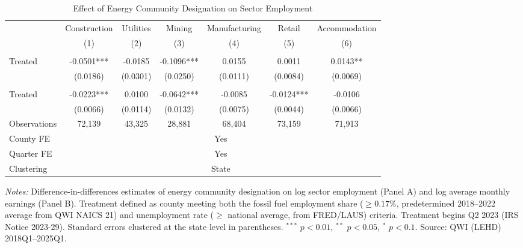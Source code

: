 \begin{table}[htbp]
\centering
\begin{threeparttable}
\caption{Effect of Energy Community Designation on Sector Employment}
\label{tab:main}
\footnotesize
\begin{tabular}{lcccccc}
\toprule
 & Construction & Utilities & Mining & Manufacturing & Retail & Accommodation \\
 & (1) & (2) & (3) & (4) & (5) & (6) \\
\midrule
\addlinespace
\multicolumn{7}{l}{\textit{Panel A: Log Employment}} \\
\addlinespace
Treated & -0.0501*** & -0.0185 & -0.1096*** & 0.0155 & 0.0011 & 0.0143** \\
 & (0.0186) & (0.0301) & (0.0250) & (0.0111) & (0.0084) & (0.0069) \\
\addlinespace
\multicolumn{7}{l}{\textit{Panel B: Log Earnings}} \\
\addlinespace
Treated & -0.0223*** & 0.0100 & -0.0642*** & -0.0085 & -0.0124*** & -0.0106 \\
 & (0.0066) & (0.0114) & (0.0132) & (0.0075) & (0.0044) & (0.0066) \\
\addlinespace
\midrule
Observations & 72,139 & 43,325 & 28,881 & 68,404 & 73,159 & 71,913 \\
County FE & \multicolumn{6}{c}{Yes} \\
Quarter FE & \multicolumn{6}{c}{Yes} \\
Clustering & \multicolumn{6}{c}{State} \\
\bottomrule
\end{tabular}
\begin{tablenotes}[flushleft]\scriptsize
\item \textit{Notes:} Difference-in-differences estimates of energy community designation on log sector employment (Panel A) and log average monthly earnings (Panel B). Treatment defined as county meeting both the fossil fuel employment share ($\geq 0.17\%$, predetermined 2018--2022 average from QWI NAICS 21) and unemployment rate ($\geq$ national average, from FRED/LAUS) criteria. Treatment begins Q2 2023 (IRS Notice 2023-29). Standard errors clustered at the state level in parentheses. $^{***}$ $p<0.01$, $^{**}$ $p<0.05$, $^{*}$ $p<0.1$. Source: QWI (LEHD) 2018Q1--2025Q1.
\end{tablenotes}
\end{threeparttable}
\end{table}
